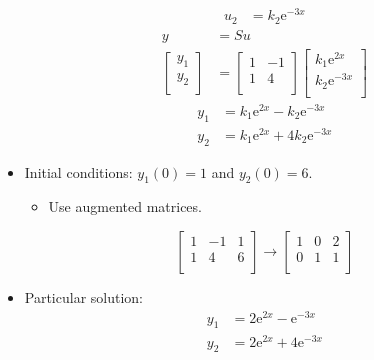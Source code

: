 \documentclass{article}
\newcommand{\e}{\text{e}}
\begin{document}
\begin{itemize}
\begin{align*}
        u_2 &= k_2\e^{-3x}
    \end{align*}
    \begin{align*}
        y &= Su\\
        \begin{bmatrix}
            y_1\\
            y_2\\
        \end{bmatrix}
        &=
        \begin{bmatrix}
            1 & -1\\
            1 & 4\\
        \end{bmatrix}
        \begin{bmatrix}
            k_1\e^{2x}\\
            k_2\e^{-3x}\\
        \end{bmatrix}
    \end{align*}
    \begin{align*}
        y_1 &= k_1\e^{2x}-k_2\e^{-3x}\\
        y_2 &= k_1\e^{2x}+4k_2\e^{-3x}
    \end{align*}
    \item {}Initial conditions: $y_1(0)=1$ and $y_2(0)=6$.
    \begin{itemize}
        \item Use augmented matrices.
    \end{itemize}
    \begin{equation*}
        \begin{bmatrix}
            1 & -1 & 1\\
            1 & 4 & 6\\
        \end{bmatrix}
        \rightarrow
        \begin{bmatrix}
            1 & 0 & 2\\
            0 & 1 & 1\\
        \end{bmatrix}
    \end{equation*}
    \item Particular solution:
    \begin{align*}
        y_1 &= 2\e^{2x}-\e^{-3x}\\
        y_2 &= 2\e^{2x}+4\e^{-3x}
    \end{align*}
\end{itemize}
\end{document}
